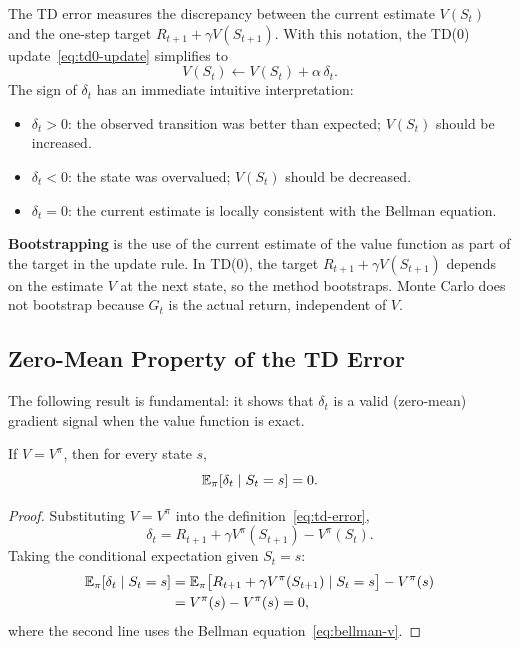 The TD error measures the discrepancy between the current estimate $V(S_t)$ and the one-step target $R_{t+1}+\gamma V(S_{t+1})$.  With this notation, the TD(0) update~\eqref{eq:td0-update} simplifies to
\[
V(S_t) \leftarrow V(S_t) + \alpha\,\delta_t.
\]
The sign of $\delta_t$ has an immediate intuitive interpretation:
\begin{itemize}[leftmargin=*]
  \item $\delta_t > 0$: the observed transition was better than expected; $V(S_t)$ should be increased.
  \item $\delta_t < 0$: the state was overvalued; $V(S_t)$ should be decreased.
  \item $\delta_t = 0$: the current estimate is locally consistent with the Bellman equation.
\end{itemize}

\begin{definition}[Bootstrapping]
\label{def:bootstrap}
\textbf{Bootstrapping} is the use of the current estimate of the value function as part of the target in the update rule.  In TD(0), the target $R_{t+1}+\gamma V(S_{t+1})$ depends on the estimate $V$ at the next state, so the method bootstraps.  Monte Carlo does not bootstrap because $G_t$ is the actual return, independent of $V$.
\end{definition}

\subsection{Zero-Mean Property of the TD Error}

The following result is fundamental: it shows that $\delta_t$ is a valid (zero-mean) gradient signal when the value function is exact.

\begin{theorem}
\label{thm:td-error-zero-mean}
If $V = V^\pi$, then for every state $s$,
\begin{equation}
\label{eq:td-zero-mean}
\operatorname{\mathbb{E}}_\pi[\delta_t \mid S_t = s] = 0.
\end{equation}
\end{theorem}

\begin{proof}
Substituting $V = V^\pi$ into the definition~\eqref{eq:td-error},
\[
\delta_t = R_{t+1} + \gamma V^\pi(S_{t+1}) - V^\pi(S_t).
\]
Taking the conditional expectation given $S_t = s$:
\begin{align*}
\operatorname{\mathbb{E}}_\pi[\delta_t \mid S_t = s]
&= \operatorname{\mathbb{E}}_\pi\bigl[R_{t+1} + \gamma V^\pi(S_{t+1}) \mid S_t = s\bigr] - V^\pi(s)\\
&= V^\pi(s) - V^\pi(s) = 0,
\end{align*}
where the second line uses the Bellman equation~\eqref{eq:bellman-v}.
\end{proof}

